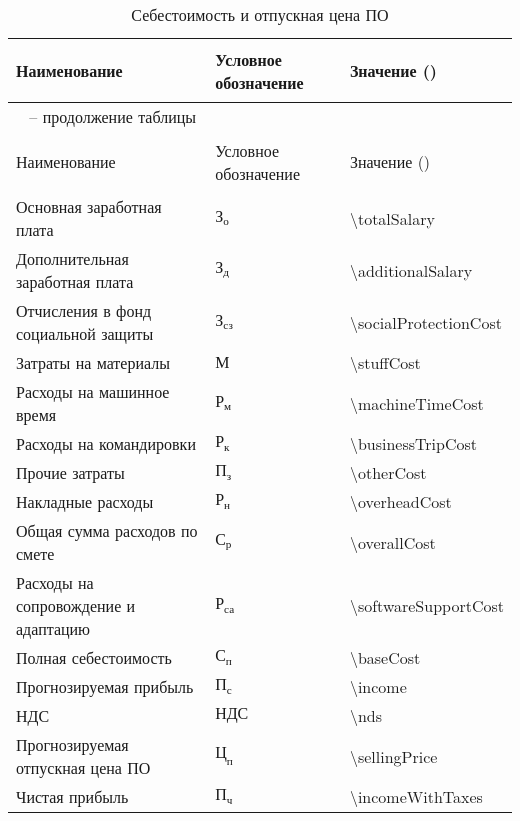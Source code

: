 \begin{longtable}{| >{\raggedright}m{}
                  | >{\centering}m{}
                  | >{\centering\arraybackslash}m{}|}
\caption{Себестоимость и отпускная цена ПО}
\label{table:econ:selfprice} \\

\hline
{\begin{center}
  Наименование
\end{center} } & Условное обозначение & Значение (\byr{}) \\
\endfirsthead

\multicolumn{3}{l}%
{{\tablename\ \thetable{} -- продолжение таблицы}} \\
\hline
{\begin{center}
  Наименование
\end{center} } & Условное обозначение & Значение (\byr{}) \\
\endhead

\hline
Основная заработная плата & $\text{З}_{\text{о}}$ & \num{\totalSalary} \\
\hline
Дополнительная заработная плата & $\text{З}_{\text{д}}$ & \num{\additionalSalary} \\
\hline
Отчисления в фонд социальной защиты & $\text{З}_{\text{сз}}$ &\num{\socialProtectionCost} \\
\hline
Затраты на материалы & $\text{М}$ &\num{\stuffCost} \\
\hline
Расходы на машинное время & $\text{Р}_{\text{м}}$ &\num{\machineTimeCost} \\
\hline
Расходы на командировки & $\text{Р}_{\text{к}}$ &\num{\businessTripCost} \\
\hline
Прочие затраты & $\text{П}_{\text{з}}$ &\num{\otherCost} \\
\hline
Накладные расходы & $\text{Р}_{\text{н}}$ &\num{\overheadCost} \\
\hline
Общая сумма расходов по смете & $\text{С}_{\text{р}}$ &\num{\overallCost} \\
\hline
Расходы на сопровождение и адаптацию & $\text{Р}_{\text{са}}$ &\num{\softwareSupportCost} \\
\hline
Полная себестоимость & $\text{С}_{\text{п}}$ &\num{\baseCost} \\
\hline
Прогнозируемая прибыль & $\text{П}_{\text{с}}$ &\num{\income} \\
\hline
НДС & $\text{НДС}$ &\num{\nds} \\
\hline
Прогнозируемая отпускная цена ПО & $\text{Ц}_{\text{п}}$ &\num{\sellingPrice} \\
\hline
Чистая прибыль & $\text{П}_{\text{ч}}$ &\num{\incomeWithTaxes} \\
\hline
\end{longtable}
\hfill

